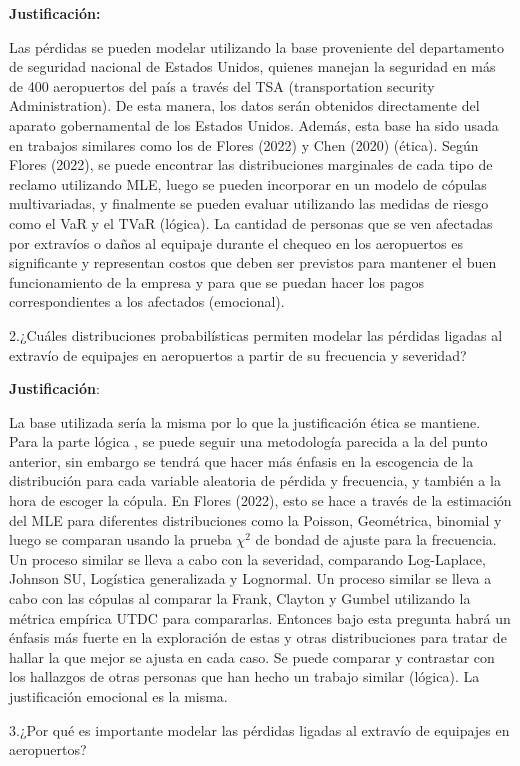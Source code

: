 \documentclass[
  letterpaper,
  onepage,
  openany]{scrreprt}
\begin{document}
\textbf{Justificación:}

Las pérdidas se pueden modelar utilizando la base proveniente del
departamento de seguridad nacional de Estados Unidos, quienes manejan la
seguridad en más de 400 aeropuertos del país a través del TSA
(transportation security Administration). De esta manera, los datos
serán obtenidos directamente del aparato gobernamental de los Estados
Unidos. Además, esta base ha sido usada en trabajos similares como los
de Flores (2022) y Chen (2020) (ética). Según Flores (2022), se puede
encontrar las distribuciones marginales de cada tipo de reclamo
utilizando MLE, luego se pueden incorporar en un modelo de cópulas
multivariadas, y finalmente se pueden evaluar utilizando las medidas de
riesgo como el VaR y el TVaR (lógica). La cantidad de personas que se
ven afectadas por extravíos o daños al equipaje durante el chequeo en
los aeropuertos es significante y representan costos que deben ser
previstos para mantener el buen funcionamiento de la empresa y para que
se puedan hacer los pagos correspondientes a los afectados (emocional).

2.¿Cuáles distribuciones probabilísticas permiten modelar las pérdidas
ligadas al extravío de equipajes en aeropuertos a partir de su
frecuencia y severidad?

\textbf{Justificación}:

La base utilizada sería la misma por lo que la justificación ética se
mantiene. Para la parte lógica , se puede seguir una metodología
parecida a la del punto anterior, sin embargo se tendrá que hacer más
énfasis en la escogencia de la distribución para cada variable aleatoria
de pérdida y frecuencia, y también a la hora de escoger la cópula. En
Flores (2022), esto se hace a través de la estimación del MLE para
diferentes distribuciones como la Poisson, Geométrica, binomial y luego
se comparan usando la prueba \(\chi^2\) de bondad de ajuste para la
frecuencia. Un proceso similar se lleva a cabo con la severidad,
comparando Log-Laplace, Johnson SU, Logística generalizada y Lognormal.
Un proceso similar se lleva a cabo con las cópulas al comparar la Frank,
Clayton y Gumbel utilizando la métrica empírica UTDC para compararlas.
Entonces bajo esta pregunta habrá un énfasis más fuerte en la
exploración de estas y otras distribuciones para tratar de hallar la que
mejor se ajusta en cada caso. Se puede comparar y contrastar con los
hallazgos de otras personas que han hecho un trabajo similar (lógica).
La justificación emocional es la misma.

3.¿Por qué es importante modelar las pérdidas ligadas al extravío de
equipajes en aeropuertos?
\end{document}

